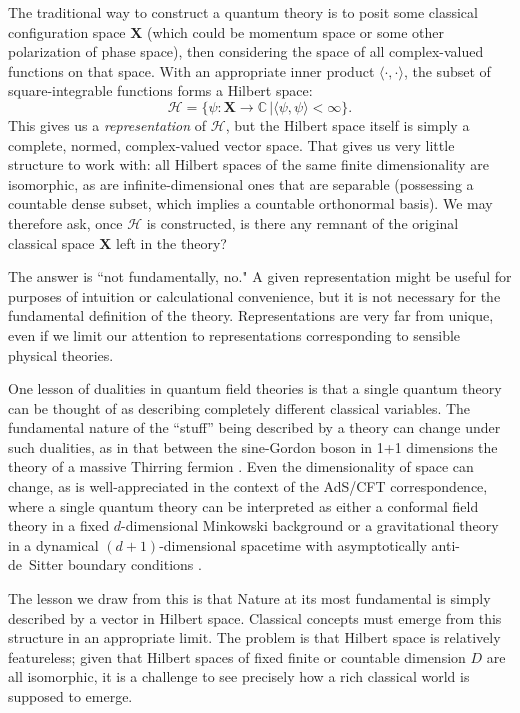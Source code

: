 \documentclass[12pt,english]{article}
\newcommand{\be}{\begin{equation}}
\newcommand{\ee}{\end{equation}}
\newcommand{\HH}{\mathcal{H}}
\begin{document}
The traditional way to construct a quantum theory is to posit some classical configuration space $\mathbf{X}$ (which could be momentum space or some other polarization of phase space), then considering the space of all complex-valued functions on that space.
With an appropriate inner product $\langle \cdot,\cdot\rangle$, the subset of square-integrable functions forms a Hilbert space:
\be
 \HH = \{\psi : \mathbf{X} \rightarrow \mathbb{C}\, {\big|} \langle\psi, \psi\rangle < \infty\}.
\ee
This gives us a \emph{representation} of $\HH$, but the Hilbert space itself is simply a complete, normed, complex-valued vector space. 
That gives us very little structure to work with: all Hilbert spaces of the same finite dimensionality are isomorphic, as are infinite-dimensional ones that are separable (possessing a countable dense subset, which implies a countable orthonormal basis).
We may therefore ask, once $\HH$ is constructed, is there any remnant of the original classical space $\mathbf{X}$ left in the theory?

The answer is ``not fundamentally, no."
A given representation might be useful for purposes of intuition or calculational convenience, but it is not necessary for the fundamental definition of the theory.
Representations are very far from unique, even if we limit our attention to representations corresponding to sensible physical theories.

One lesson of dualities in quantum field theories is that a single quantum theory can be thought of as describing completely different classical variables.
The fundamental nature of the ``stuff'' being described by a theory can change under such dualities, as in that between the sine-Gordon boson in 1+1 dimensions the theory of a massive Thirring fermion \cite{PhysRevD.11.2088}.
Even the dimensionality of space can change, as is well-appreciated in the context of the AdS/CFT correspondence, where a single quantum theory can be interpreted as either a conformal field theory in a fixed $d$-dimensional Minkowski background or a gravitational theory in a dynamical $(d+1)$-dimensional spacetime with asymptotically anti-de~Sitter boundary conditions \cite{Maldacena:1997re}.

The lesson we draw from this is that Nature at its most fundamental is simply described by a vector in Hilbert space.
Classical concepts must emerge from this structure in an appropriate limit.
The problem is that Hilbert space is relatively featureless; given that Hilbert spaces of fixed finite or countable dimension $D$ are all isomorphic, it is a challenge to see precisely how a rich classical world is supposed to emerge.
\end{document}
